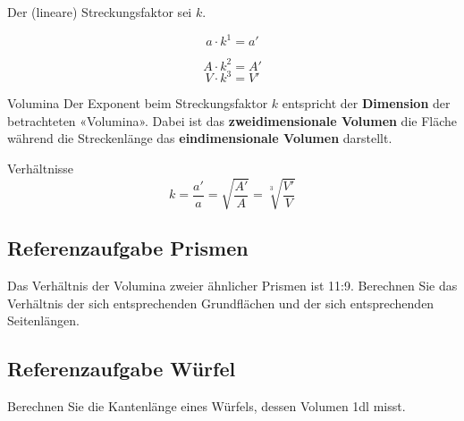 \begin{gesetz}{}{}
  Der (lineare) Streckungsfaktor sei $k$.

  $$a \cdot{} k^1 = a'$$

  $$A \cdot{} k^2 = A'$$
  $$V \cdot{} k^3 = V'$$
\end{gesetz}

\begin{bemerkung}{Volumina}{}
Der Exponent beim Streckungsfaktor $k$ entspricht der \textbf{Dimension} der
betrachteten «Volumina». Dabei ist das \textbf{zweidimensionale Volumen} die
Fläche während die Streckenlänge das \textbf{eindimensionale Volumen} darstellt.
\end{bemerkung}

\begin{bemerkung}{Verhältnisse}{}
  $$k = \frac{a'}{a} = \sqrt{\frac{A'}{A}} = \sqrt[3\,\,\,]{\frac{V'}{V}}$$
\end{bemerkung}
\newpage


\subsection{Referenzaufgabe Prismen}
Das Verhältnis der Volumina zweier ähnlicher Prismen ist
11:9. Berechnen Sie das Verhältnis der sich entsprechenden Grundflächen und
der sich entsprechenden Seitenlängen.


\subsection{Referenzaufgabe Würfel}
Berechnen Sie die Kantenlänge eines Würfels, dessen Volumen 1dl misst.


\newpage
